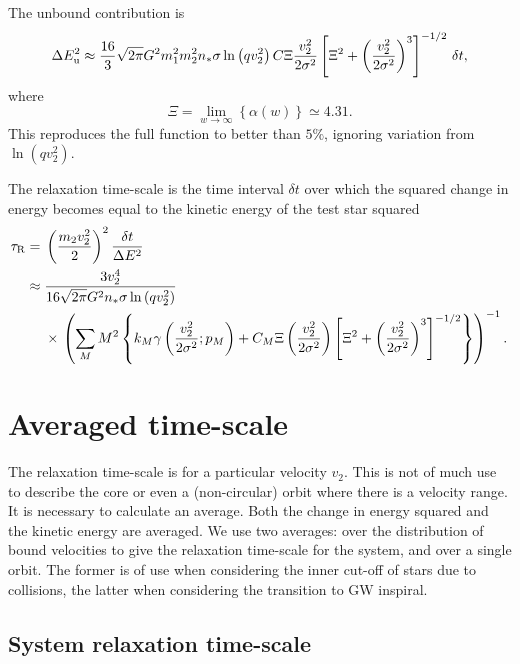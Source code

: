 The unbound contribution is
\begin{equation}
\Delta E_\mathrm{u}^2 \approx \dfrac{16}{3}\sqrt{2\pi}G^2m_1^2m_2^2n_\ast\sigma\ln\left(qv_2^2\right) C \Xi \dfrac{v_2^2}{2\sigma^2} \left[\Xi^2 + \left(\dfrac{v_2^2}{2\sigma^2}\right)^3\right]^{-1/2}\,\delta t,
\label{eq:Unbound-approx}
\end{equation}
where
\begin{equation}
\Xi = \lim_{w \rightarrow \infty}\left\{\alpha(w)\right\} \simeq 4.31.
\end{equation}
This reproduces the full function to better than $5\%$, ignoring variation from $\ln\left(qv_2^2\right)$.

The relaxation time-scale is the time interval $\delta t$ over which the squared change in energy becomes equal to the kinetic energy of the test star squared \citep{Bar-Or2012}
\begin{align}
\tau_\mathrm{R} = {} & \left(\dfrac{m_2v_2^2}{2}\right)^2\dfrac{\delta t}{\Delta E^2} \\
 \approx {} & \dfrac{3v_2^4}{16\sqrt{2\pi}G^2n_\ast\sigma\ln\left(qv_2^2\right)} \nonumber \\*
 {} & \times \left. \left(\sum_M M^2 \left\{k_M \gamma\left(\dfrac{v_2^2}{2\sigma^2};p_M\right) + C_M\Xi\left(\dfrac{v_2^2}{2\sigma^2}\right)\left[\Xi^2 + \left(\dfrac{v_2^2}{2\sigma^2}\right)^3\right]^{-1/2}\right\}\right)^{-1}. \right.
\label{eq:tau_R1}
\end{align}

\section{Averaged time-scale}

The relaxation time-scale  is for a particular velocity $v_2$. This is not of much use to describe the core or even a (non-circular) orbit where there is a velocity range. It is necessary to calculate an average. Both the change in energy squared and the kinetic energy are averaged. We use two averages: over the distribution of bound velocities to give the relaxation time-scale for the system, and over a single orbit. The former is of use when considering the inner cut-off of stars due to collisions, the latter when considering the transition to GW inspiral.

\subsection{System relaxation time-scale}\label{sec:system-ave}

